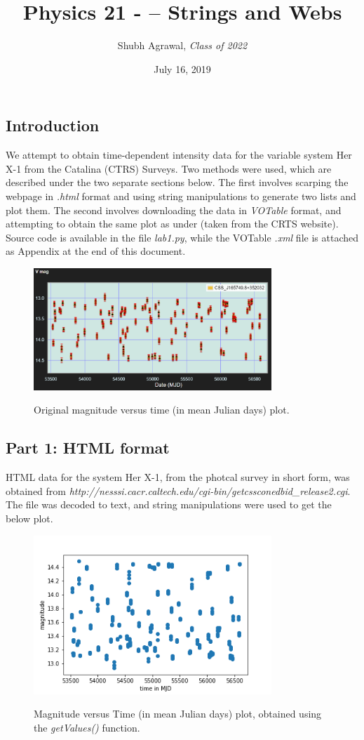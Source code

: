 \documentclass{article}
\title{\Large  Physics 21 - – Strings and Webs}
\author{\large Shubh Agrawal, \normalsize\emph{Class of 2022}}
\date{\small July 16, 2019}
\begin{document}
\maketitle
\subsection*{Introduction}
We attempt to obtain time-dependent intensity data for the variable system Her X-1 from the Catalina (CTRS) Surveys. Two methods were used, which are described under the two separate sections below. The first involves scarping the webpage in \textit{.html} format and using string manipulations to generate two lists and plot them. The second involves downloading the data in \textit{VOTable} format, and attempting to obtain the same plot as under (taken from the CRTS website). Source code is available in the file \textit{lab1.py}, while the VOTable \textit{.xml} file is attached as Appendix at the end of this document.
\begin{figure}[H]
	\centering
	\includegraphics[width = 0.8\textwidth]{org.png}
	\label{orig}
	\caption{Original magnitude versus time (in mean Julian days) plot.}
\end{figure}
\pagebreak
\subsection*{Part 1: HTML format}
HTML data for the system Her X-1, from the photcal survey in short form, was obtained from \textit{http://nesssi.cacr.caltech.edu/cgi-bin/getcssconedbid\_release2.cgi}. The file was decoded to text, and string manipulations were used to get the below plot.
\begin{figure}[H]
	\centering
	\includegraphics[width = 0.8\textwidth]{html.png}
	\label{html}
	\caption{Magnitude versus Time (in mean Julian days) plot, obtained using the \textit{getValues()} function.}
\end{figure}
\end{document}
